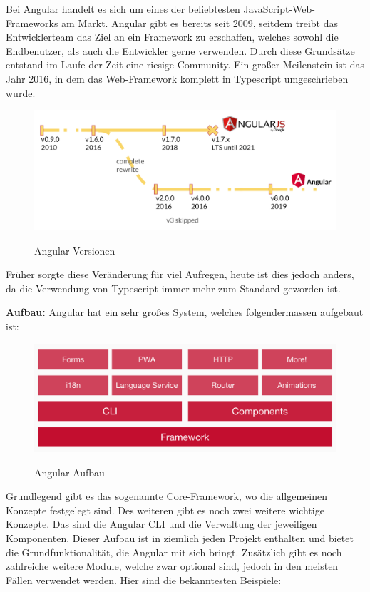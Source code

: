 Bei Angular handelt es sich um eines der beliebtesten JavaScript-Web-Frameworks am Markt. Angular gibt es bereits seit 2009, seitdem treibt das Entwicklerteam das Ziel an ein Framework zu erschaffen, welches sowohl die Endbenutzer, als auch die Entwickler gerne verwenden. Durch diese Grundsätze entstand im Laufe der Zeit eine riesige Community. Ein großer Meilenstein ist das Jahr 2016, in dem das Web-Framework komplett in Typescript umgeschrieben wurde.

\begin{figure}[h!]
    \centering
    \includegraphics[width=1\textwidth]{pics/angular-versions.png}
    \caption{Angular Versionen}
    \cite{frontend_web_angular_introduction}
    \label{fig:mesh1}
\end{figure}

Früher sorgte diese Veränderung für viel Aufregen, heute ist dies jedoch anders, da die Verwendung von Typescript immer mehr zum Standard geworden ist.

\newpage
\textbf{Aufbau:}
\newline
Angular hat ein sehr großes System, welches folgendermassen aufgebaut ist:

\begin{figure}[h!]
    \centering
    \includegraphics[width=1\textwidth]{pics/angular-architecture.png}
    \caption{Angular Aufbau}
    \cite{frontend_web_angular_introduction}
    \label{fig:mesh1}
\end{figure}

Grundlegend gibt es das sogenannte Core-Framework, wo die allgemeinen Konzepte festgelegt sind. Des weiteren gibt es noch zwei weitere wichtige Konzepte. Das sind die Angular CLI und die Verwaltung der jeweiligen Komponenten. Dieser Aufbau ist in ziemlich jeden Projekt enthalten und bietet die Grundfunktionalität, die Angular mit sich bringt. Zusätzlich gibt es noch zahlreiche weitere Module, welche zwar optional sind, jedoch in den meisten Fällen verwendet werden. Hier sind die bekanntesten Beispiele:

